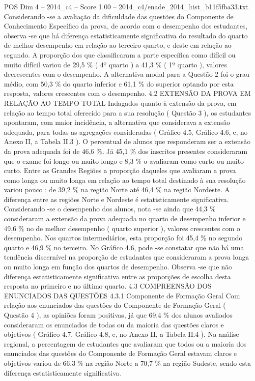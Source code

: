 \begin{textsample}{POS Dim 4 – 2014\_c4 – Score 1.00 – 2014\_c4/enade\_2014\_hist\_b11f5fba33.txt}
Considerando -se a avaliação da dificuldade das questões do Componente de Conhecimento Específico da prova, de acordo com o desempenho dos estudantes, observa -se que há diferença estatisticamente significativa do resultado do quarto de melhor desempenho em relação ao terceiro quarto, e deste em relação ao segundo.
A proporção dos que classificaram a parte específica como difícil ou muito difícil variou de 29,5 \% ( 4º quarto ) a 41,3 \% ( 1º quarto ), valores decrescentes com o desempenho.
A alternativa modal para a Questão 2 foi o grau médio, com 50,3 \% do quarto inferior e 61,1 \% do superior optando por esta resposta, valores crescentes com o desempenho. 4.2 EXTENSÃO DA PROVA EM RELAÇÃO AO TEMPO TOTAL Indagados quanto à extensão da prova, em relação ao tempo total oferecido para a sua resolução ( Questão 3 ), os estudantes apontaram, com maior incidência, a alternativa que considerava a extensão adequada, para todas as agregações consideradas ( Gráfico 4.5, Gráfico 4.6, e, no Anexo II, a Tabela II.3 ).
O percentual de alunos que responderam ser a extensão da prova adequada foi de 46,6 \%.
Já 45,1 \% dos inscritos presentes consideraram que o exame foi longo ou muito longo e 8,3 \% o avaliaram como curto ou muito curto.
Entre as Grandes Regiões a proporção daqueles que avaliaram a prova como longa ou muito longa em relação ao tempo total destinado à sua resolução variou pouco : de 39,2 \% na região Norte até 46,4 \% na região Nordeste.
A diferença entre as regiões Norte e Nordeste é estatisticamente significativa.
Considerando -se o desempenho dos alunos, nota -se ainda que 44,3 \% consideraram a extensão da prova adequada no quarto de desempenho inferior e 49,6 \% no de melhor desempenho ( quarto superior ), valores crescentes com o desempenho.
Nos quartos intermediários, esta proporção foi 45,4 \% no segundo quarto e 46,9 \% no terceiro.
No Gráfico 4.6, pode -se constatar que não há uma tendência discernível na proporção de estudantes que consideraram a prova longa ou muito longa em função dos quartos de desempenho.
Observa -se que não diferença estatisticamente significativa entre as proporções de escolha desta resposta no primeiro e no último quarto. 4.3 COMPREENSÃO DOS ENUNCIADOS DAS QUESTÕES 4.3.1 Componente de Formação Geral Com relação aos enunciados das questões do Componente de Formação Geral ( Questão 4 ), as opiniões foram positivas, já que 69,4 \% dos alunos avaliados consideraram os enunciados de todas ou da maioria das questões claros e objetivos ( Gráfico 4.7, Gráfico 4.8, e, no Anexo II, a Tabela II.4 ).
Na análise regional, a percentagem de estudantes que avaliaram que todos ou a maioria dos enunciados das questões do Componente de Formação Geral estavam claros e objetivos variou de 66,3 \% na região Norte a 70,7 \% na região Sudeste, sendo esta diferença estatisticamente significativa.

\end{textsample}
